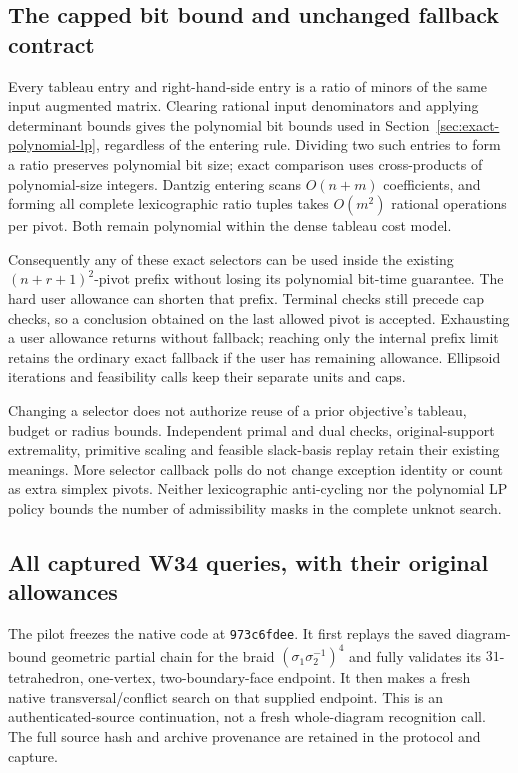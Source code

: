 \subsection{The capped bit bound and unchanged fallback contract}

Every tableau entry and right-hand-side entry is a ratio of minors of
the same input augmented matrix.  Clearing rational input denominators
and applying determinant bounds gives the polynomial bit bounds used in
Section~\ref{sec:exact-polynomial-lp}, regardless of the entering rule.
Dividing two such entries to form a ratio preserves polynomial bit size;
exact comparison uses cross-products of polynomial-size integers.
Dantzig entering scans $O(n+m)$ coefficients, and forming all complete
lexicographic ratio tuples takes $O(m^2)$ rational operations per pivot.
Both remain polynomial within the dense tableau cost model.

Consequently any of these exact selectors can be used inside the existing
$(n+r+1)^2$-pivot prefix without losing its polynomial bit-time guarantee.
The hard user allowance can shorten that prefix.  Terminal checks still
precede cap checks, so a conclusion obtained on the last allowed pivot is
accepted.  Exhausting a user allowance returns  without
fallback; reaching only the internal prefix limit retains the ordinary
exact fallback if the user has remaining allowance.  Ellipsoid iterations
and feasibility calls keep their separate units and caps.

Changing a selector does not authorize reuse of a prior objective's
tableau, budget or radius bounds.  Independent primal and dual checks,
original-support extremality, primitive scaling and feasible slack-basis
replay retain their existing meanings.  More selector callback polls do
not change exception identity or count as extra simplex pivots.  Neither
lexicographic anti-cycling nor the polynomial LP policy bounds the number
of admissibility masks in the complete unknot search.

\subsection{All captured W34 queries, with their original allowances}

The pilot freezes the native code at \texttt{973c6fdee}.  It first replays
the saved diagram-bound geometric partial chain for the braid
$(\sigma_1\sigma_2^{-1})^4$ and fully validates its $31$-tetrahedron,
one-vertex, two-boundary-face endpoint.  It then makes a fresh native
transversal/conflict search on that supplied endpoint.  This is an
authenticated-source continuation, not a fresh whole-diagram recognition
call.  The full source hash and archive provenance are retained in the
protocol and capture.

